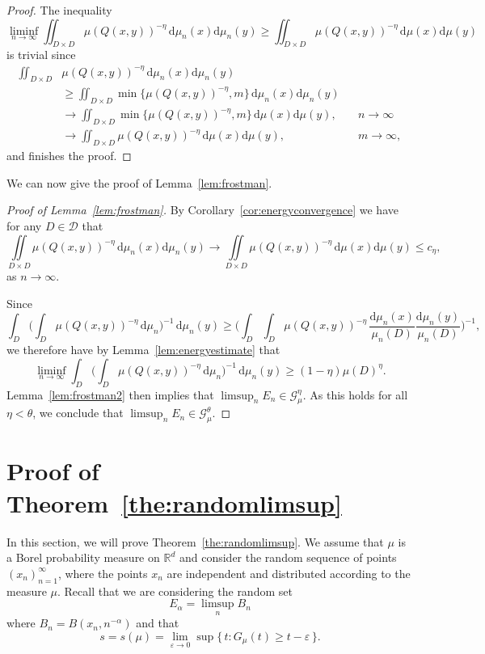 \documentclass[10pt]{amsart}
\theoremstyle{definition}\newtheorem{defi}[theo]{Definition}\newtheorem{rema}[theo]{Remark}\newtheorem{exam}[theo]{Example}\newtheorem{exem}[theo]{Example}\newtheorem{nota}[theo]{Notation}
\newcommand*{\dd}{\mathrm{d}}
\begin{document}
\begin{proof}
The inequality
\[
\liminf_{n\to \infty} \iint_{D \times D} \mu (Q (x,y))^{-\eta} \,
\dd \mu_n (x) \dd \mu_n (y) \geq \iint_{D \times D} \mu(Q (x,y))^{-\eta} \, \dd\mu (x) \dd \mu (y)
\]
is trivial since
\begin{align*}
\iint_{D \times D} & \mu (Q (x,y))^{-\eta} \, \dd \mu_n (x)
\dd \mu_n (y) \\ & \geq \iint_{D \times D} \min \{ \mu (Q (x,y))^{-\eta}, m \} \, \dd \mu_n (x) \dd \mu_n (y)
\\ &\to \iint_{D \times D} \min \{ \mu (Q (x,y))^{-\eta}, m \} \,
\dd \mu (x) \dd \mu (y), && n \to \infty \\ &\to
\iint_{D \times D} \mu (Q (x,y))^{-\eta} \, \dd \mu (x)
\dd \mu (y), && m \to \infty,
\end{align*}
and finishes the proof.
\end{proof}

We can now give the proof of Lemma~\ref{lem:frostman}.

\begin{proof}[Proof of Lemma~\ref{lem:frostman}]
By Corollary~\ref{cor:energyconvergence} we have for any $D \in
\mathscr{D}$ that
\[
\iint\limits_{D \times D} \mu (Q(x,y))^{-\eta} \, \dd \mu_n (x) \dd \mu_n (y) \to \iint\limits_{D \times D} \mu (Q(x,y))^{-\eta} \, \dd \mu (x) \dd \mu (y) \leq c_\eta,
\]
as $n \to \infty$.

Since
\[
\int_D \biggl(\int_D \mu (Q(x,y))^{-\eta} \, \dd \mu_n
\biggr)^{-1} \, \dd \mu_n (y) \geq \biggl(\int_D \int_D
\mu(Q(x,y))^{-\eta} \, \frac{\dd \mu_n (x)}{\mu_n (D)}
\frac{\dd \mu_n (y)}{\mu_n (D)} \biggr)^{-1},
\]
we therefore have by Lemma~\ref{lem:energyestimate} that
\[
\liminf_{n \to \infty} \int_D \biggl(\int_D \mu (Q(x,y))^{-\eta}
\, \dd \mu_n \biggr)^{-1} \, \dd \mu_n (y)
\geq (1- \eta) \mu (D)^\eta.
\]
Lemma~\ref{lem:frostman2} then implies that $\limsup_n E_n \in
\mathscr{G}_\mu^\eta$. As this holds for all $\eta < \theta$, we conclude that $\limsup_n E_n \in \mathscr{G}_\mu^\theta$.
\end{proof}


\section{Proof of Theorem~\ref{the:randomlimsup}} \label{sec:randomproof}

In this section, we will prove Theorem~\ref{the:randomlimsup}. We assume that $\mu$ is a Borel probability measure on $\mathbb{R}^d$ and consider the random sequence of points $(x_n)_{n=1}^\infty$, where the points $x_n$ are independent and distributed according to the measure $\mu$. Recall that we are considering the random set
\[
E_\alpha = \limsup_n B_n
\]
where $B_n = B(x_n,n^{-\alpha})$ and that
\[
s = s(\mu) = \lim_{\varepsilon \to 0} \sup \{\, t : G_\mu (t) \geq t - \varepsilon \,\}.
\]
\end{document}

